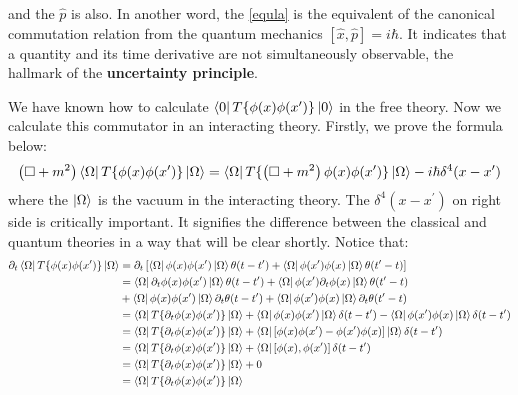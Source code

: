\documentclass[12pt,openany]{book}
\begin{document}
	 and the $\hat{p}$ is also. In another word, the \eqref{equla} is the equivalent of the canonical commutation relation
	 from the quantum mechanics $\left[\hat{x},\hat{p}\right]=i\hbar$. It indicates that a quantity and its time derivative are not
	 simultaneously observable, the hallmark of the \textbf{uncertainty principle}.
	 \par 
	 We have known how to calculate $\bra{0}T\{\phi(x)\phi(x^\prime)\}\ket{0}$ in the free theory. Now we 
	 calculate this commutator in an interacting theory. Firstly, we prove the formula below:
	 \begin{equation*}
	 	\left(\Box+m^2\right)\bra{\Omega}T\{\phi(x)\phi(x^\prime)\}\ket{\Omega}=\bra{\Omega}T\{\left(\Box+m^2\right)\phi(x)\phi(x^\prime)\}\ket{\Omega}-i\hbar\delta^4(x-x^\prime)
	 \end{equation*}
	 where the $\ket{\Omega}$ is the vacuum in the interacting theory. The $\delta^4(x-x^\prime)$ on right side is critically
	 important. It signifies the difference between the classical and quantum theories in a way that will be clear shortly.
	 Notice that:
	 \begin{equation}
	 	\begin{aligned}
	 		\partial_t\bra{\Omega}T\{\phi(x)\phi(x^\prime)\}\ket{\Omega}&=\partial_t\left[\bra{\Omega}\phi(x)\phi(x^\prime)\ket{\Omega}\theta(t-t^\prime)+ \bra{\Omega}\phi(x^\prime)\phi(x)\ket{\Omega}\theta(t^\prime-t)\right]\\
	 		                                                            &=\bra{\Omega}\partial_t\phi(x)\phi(x^\prime)\ket{\Omega}\theta(t-t^\prime)+\bra{\Omega}\phi(x^\prime)\partial_t\phi(x)\ket{\Omega}\theta(t^\prime-t)\\
	 		                                                            &+\bra{\Omega}\phi(x)\phi(x^\prime)\ket{\Omega}\partial_t\theta(t-t^\prime)+\bra{\Omega}\phi(x^\prime)\phi(x)\ket{\Omega}\partial_t\theta(t^\prime-t)\\
	 		                                                            &=\bra{\Omega}T\{\partial_t\phi(x)\phi(x^\prime)\}\ket{\Omega}+\bra{\Omega}\phi(x)\phi(x^\prime)\ket{\Omega}\delta(t-t^\prime)-\bra{\Omega}\phi(x^\prime)\phi(x)\ket{\Omega}\delta(t-t^\prime)\\
	 		                                                            &=\bra{\Omega}T\{\partial_t\phi(x)\phi(x^\prime)\}\ket{\Omega}+\bra{\Omega}\left[\phi(x)\phi(x^\prime)-\phi(x^\prime)\phi(x)\right]\ket{\Omega}\delta(t-t^\prime)\\
	 		                                                            &=\bra{\Omega}T\{\partial_t\phi(x)\phi(x^\prime)\}\ket{\Omega}+\bra{\Omega}\left[\phi(x),\phi(x^\prime)\right]\delta(t-t^\prime)\\
	 		                                                            &=\bra{\Omega}T\{\partial_t\phi(x)\phi(x^\prime)\}\ket{\Omega}+0\\
	 		                                                            &=\bra{\Omega}T\{\partial_t\phi(x)\phi(x^\prime)\}\ket{\Omega}
	 	\end{aligned}
	 \end{equation}
\end{document}
